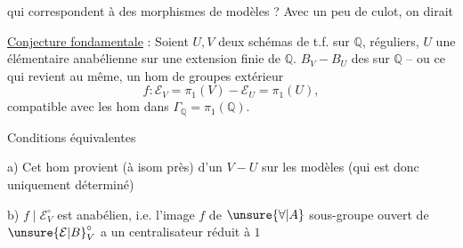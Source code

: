 qui correspondent à des morphismes de modèles ? Avec un peu de culot, on dirait

\uline{Conjecture fondamentale} : Soient $U,V$ deux schémas de t.f. sur $\mathbb{Q}$,  réguliers, $U$ une   élémentaire anabélienne sur une extension finie de $\mathbb{Q}$.     $B_V-B_U$ des   sur $\mathbb{Q}$ -- ou ce qui revient au même, un hom de groupes extérieur
\[
f:\mathcal E_V=\pi_1(V)-\mathcal E_U=\pi_1(U),
\]
compatible avec les hom dans $\Gamma_{\mathbb{Q}}=\pi_1(\mathbb{Q})$.

Conditions équivalentes

 a) Cet hom provient (à isom près) d'un  $V-U$ sur les modèles (qui est donc uniquement déterminé)

 b) $f\mid\mathcal E_V^\circ$ est anabélien, i.e. l'image  $f$ de $\unsure{\forall|A}$ sous-groupe ouvert de $\unsure{\mathcal E|B}_V^\circ$ a un centralisateur réduit à $1$
